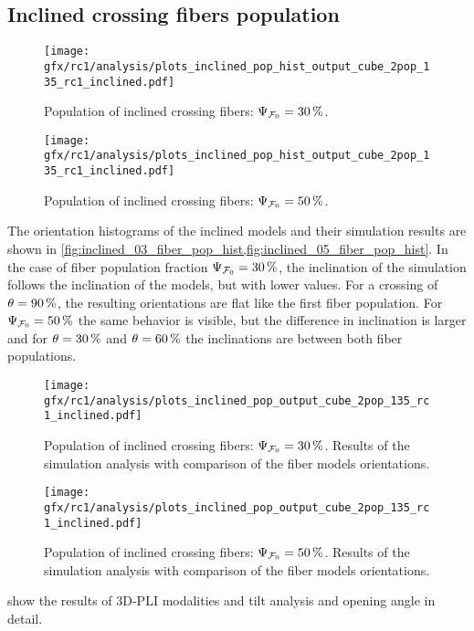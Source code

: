 \subsection{Inclined crossing fibers population}
\label{sec:resInclCross}
%
\begin{figure}[!p]
\centering
\texttt{[image: gfx/rc1/analysis/plots\_inclined\_pop\_hist\_output\_cube\_2pop\_135\_rc1\_inclined.pdf]}
\caption{Population of inclined crossing fibers: $\textnormal{$\Psi_{\textnormal{$\mathcal{F}_0$}}$}=\SI{30}{\percent}$.
}
\label{fig:inclined_03_fiber_pop_hist}
% 
\vspace{2em}
\texttt{[image: gfx/rc1/analysis/plots\_inclined\_pop\_hist\_output\_cube\_2pop\_135\_rc1\_inclined.pdf]}
\caption{Population of inclined crossing fibers: $\textnormal{$\Psi_{\textnormal{$\mathcal{F}_0$}}$}=\SI{50}{\percent}$.
}
\label{fig:inclined_05_fiber_pop_hist}
\end{figure}
%
The orientation histograms of the inclined models and their simulation results are shown in \cref{fig:inclined_03_fiber_pop_hist,fig:inclined_05_fiber_pop_hist}.
In the case of fiber population fraction $\textnormal{$\Psi_{\textnormal{$\mathcal{F}_0$}}$}=\SI{30}{\percent}$, the inclination of the simulation follows the inclination of the models, but with lower values.
For a crossing of $\textnormal{$\theta$}=\SI{90}{\percent}$, the resulting orientations are flat like the first fiber population.
For $\textnormal{$\Psi_{\textnormal{$\mathcal{F}_0$}}$}=\SI{50}{\percent}$ the same behavior is visible, but the difference in inclination is larger and for $\textnormal{$\theta$}=\SI{30}{\percent}$ and $\textnormal{$\theta$}=\SI{60}{\percent}$ the inclinations are between both fiber populations.
\par
%
\begin{figure}[!p]
\centering
\texttt{[image: gfx/rc1/analysis/plots\_inclined\_pop\_output\_cube\_2pop\_135\_rc1\_inclined.pdf]}
\caption{Population of inclined crossing fibers: $\textnormal{$\Psi_{\textnormal{$\mathcal{F}_0$}}$}=\SI{30}{\percent}$. Results of the simulation analysis with comparison of the fiber models orientations.}
\label{fig:inclined_03_fiber_pop_rofl}
\end{figure}
%
\begin{figure}[!p]
\centering
\texttt{[image: gfx/rc1/analysis/plots\_inclined\_pop\_output\_cube\_2pop\_135\_rc1\_inclined.pdf]}
\caption{Population of inclined crossing fibers: $\textnormal{$\Psi_{\textnormal{$\mathcal{F}_0$}}$}=\SI{50}{\percent}$. Results of the simulation analysis with comparison of the fiber models orientations.}
\label{fig:inclined_05_fiber_pop_rofl}
\end{figure}
%
 show the results of \ac{3D-PLI} modalities and tilt analysis and opening angle in detail.
